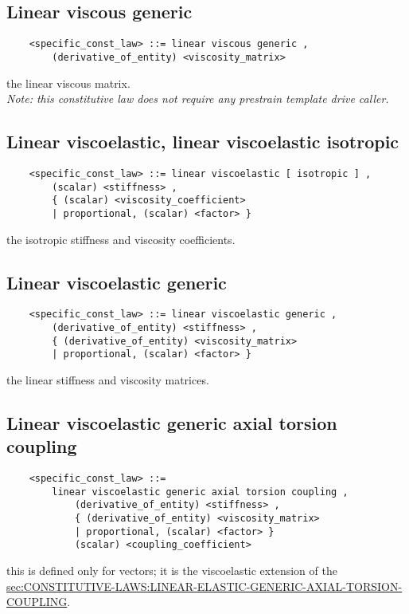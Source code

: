 \subsection{Linear viscous generic}
\begin{verbatim}
    <specific_const_law> ::= linear viscous generic , 
        (derivative_of_entity) <viscosity_matrix>
\end{verbatim}
the linear viscous matrix. \\
{\em 
    Note: this constitutive law does not require any prestrain template
    drive caller.
}
  
\subsection{Linear viscoelastic, linear viscoelastic isotropic}
\begin{verbatim}
    <specific_const_law> ::= linear viscoelastic [ isotropic ] ,
        (scalar) <stiffness> ,
        { (scalar) <viscosity_coefficient>
        | proportional, (scalar) <factor> }
\end{verbatim}
the isotropic stiffness and viscosity coefficients.
  
\subsection{Linear viscoelastic generic}
\begin{verbatim}
    <specific_const_law> ::= linear viscoelastic generic ,  
        (derivative_of_entity) <stiffness> ,
        { (derivative_of_entity) <viscosity_matrix> 
        | proportional, (scalar) <factor> }
\end{verbatim}
the linear stiffness and viscosity matrices.
  
\subsection{Linear viscoelastic generic axial torsion coupling}
\begin{verbatim}
    <specific_const_law> ::= 
        linear viscoelastic generic axial torsion coupling ,  
            (derivative_of_entity) <stiffness> ,
            { (derivative_of_entity) <viscosity_matrix> 
            | proportional, (scalar) <factor> }
            (scalar) <coupling_coefficient>
\end{verbatim}
this is defined only for  vectors; it is the viscoelastic 
extension of the 
\hyperref{\kw{linear elastic generic axial torsion coupling} constitutive law}{\kw{linear elastic generic axial torsion coupling} constitutive law (see Section~}{)}{sec:CONSTITUTIVE-LAWS:LINEAR-ELASTIC-GENERIC-AXIAL-TORSION-COUPLING}.


